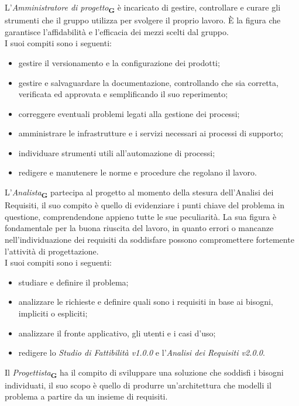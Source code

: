 L’\textit{Amministratore di progetto}\textsubscript{\textbf{G}} è incaricato di gestire, controllare e curare gli strumenti che il gruppo utilizza per svolgere il proprio lavoro. È la figura che garantisce l’affidabilità e l’efficacia dei mezzi scelti dal gruppo.\\
I suoi compiti sono i seguenti:
\begin {itemize}
\item gestire il versionamento e la configurazione dei prodotti;
\item gestire e salvaguardare la documentazione, controllando che sia corretta, verificata ed approvata e semplificando il suo reperimento;
\item correggere eventuali problemi legati alla gestione dei processi;
\item amministrare le infrastrutture e i servizi necessari ai processi di supporto;
\item individuare strumenti utili all'automazione di processi;
\item redigere e manutenere le norme e procedure che regolano il lavoro.
\end {itemize}
L'\textit{Analista}\textsubscript{\textbf{G}} partecipa al progetto al momento della stesura dell’Analisi dei Requisiti, il suo compito è quello di evidenziare i punti chiave del problema in questione, comprendendone appieno tutte le sue peculiarità. La sua figura è fondamentale per la buona riuscita del lavoro, in quanto errori o mancanze nell’individuazione dei requisiti da soddisfare possono compromettere fortemente l'attività di progettazione.\\
I suoi compiti sono i seguenti:
\begin {itemize}
\item studiare e definire il problema;
\item analizzare le richieste e definire quali sono i requisiti in base ai bisogni, impliciti o espliciti;
\item analizzare il fronte applicativo, gli utenti e i casi d’uso;
\item redigere lo \textit{Studio di Fattibilità v1.0.0} e l’\textit{Analisi dei Requisiti v2.0.0}.
\end {itemize}
Il \textit{Progettista}\textsubscript{\textbf{G}} ha il compito di sviluppare una soluzione che soddisfi i bisogni individuati, il suo scopo è quello di produrre un’architettura che modelli il problema a partire da un insieme di requisiti.\\
